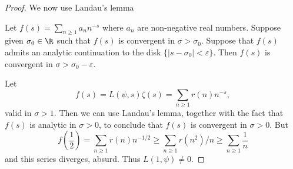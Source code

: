 \documentclass[a4paper]{article}
\theoremstyle{definition}
\begin{document}
\begin{proof}
  We now use Landau's lemma
  \begin{lemma}
    Let \(f(s) = \sum_{n \geq 1} a_n n^{-s}\) where \(a_n\) are non-negative real numbers. Suppose given \(\sigma_0 \in \R\) such that \(f(s)\) is convergent in \(\sigma > \sigma_0\). Suppose that \(f(s)\) admits an analytic continuation to the disk \(\{|s - \sigma_0| < \varepsilon\}\). Then \(f(s)\) is convergent in \(\sigma > \sigma_0 - \varepsilon\).
  \end{lemma}
  Let
  \[
    f(s) = L(\psi, s) \zeta(s) = \sum_{n \geq 1} r(n)n^{-s},
  \]
  valid in \(\sigma > 1\). Then we can use Landau's lemma, together with the fact that \(f(s)\) is analytic in \(\sigma > 0\), to conclude that \(f(s)\) is convergent in \(\sigma > 0\). But
  \[
    f\left(\frac{1}{2}\right)
    = \sum_{n \geq 1} r(n) n^{-1/2} \geq \sum_{n \geq 1} r(n^2)/n 
    \geq \sum_{n \geq 1} \frac{1}{n}
  \]
  and this series diverges, absurd. Thus \(L(1, \psi) \neq 0\).
\end{proof}














\printindex
\end{document}
